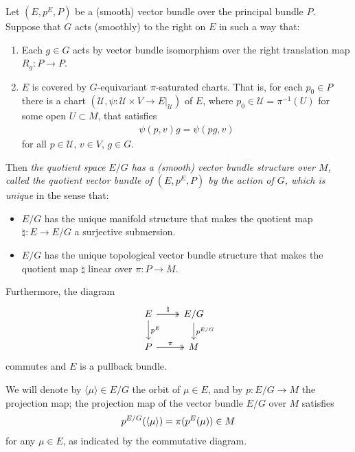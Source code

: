 \begin{proposition} \label{3.1.1}
Let $(E, p^E, P)$ be a (smooth) vector bundle over the principal bundle $P$. Suppose that $G$ acts (smoothly) to the right on $E$ in such a way that:

\begin{enumerate}
    \item Each $g \in G$ acts by vector bundle isomorphism over the right translation map $R_g: P \to P$.
    
    \item $E$ is covered by $G$-equivariant $\pi$-saturated charts. That is, for each $p_0 \in P$ there is a chart $(\mathcal U, \psi: \mathcal U \times V \to E|_{\mathcal U})$ of $E$, where $p_0 \in \mathcal U = \pi^{-1}(U)$ for some open $U \subset M$, that satisfies 
    \begin{align*}
        \psi(p, v)g = \psi(pg, v)
    \end{align*}
    for all $p \in \mathcal U$, $v \in V$, $g \in G$.
\end{enumerate}

Then \emph{the quotient space $E/G$ has a (smooth) vector bundle structure over $M$, called \emph{the quotient vector bundle of $(E, p^E, P)$ by the action of $G$}, which is unique} in the sense that:
\begin{itemize}
    \item $E/G$ has the unique manifold structure that makes the quotient map $\natural: E \to E/G$ a surjective submersion.
    \item $E/G$ has the unique topological vector bundle structure that makes the quotient map $\natural$ linear over $\pi: P \to M$.
\end{itemize}

Furthermore, the diagram
\begin{equation} \label{pullbackQuotient}
\begin{tikzcd}
    E \arrow[two heads]{r}{\natural} \arrow{d}{p^E} & E/G \arrow{d}{p^{E/G}} \\
    P \arrow[two heads]{r}{\pi}                     & M
\end{tikzcd}
\end{equation}
commutes and $E$ is a pullback bundle.

We will denote by $\langle \mu \rangle \in E/G$ the orbit of $\mu \in E$, and by $p:E/G \to M$ the projection map; the projection map of the vector bundle $E/G$ over $M$ satisfies 
\begin{align} \label{eqnProjectionOfQuotient}
    p^{E/G}(\left\langle \mu \right\rangle) = \pi(p^E(\mu)) \in M
\end{align}
for any $\mu \in E$, as indicated by the commutative diagram. 

\end{proposition}

